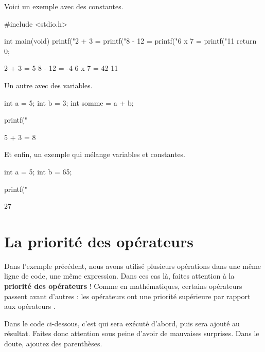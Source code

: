 Voici un exemple avec des constantes.

\begin{C}
#include <stdio.h>

int main(void)
{
    printf("2 + 3 = %
    printf("8 - 12 = %
    printf("6 x 7 = %
    printf("11 %
    return 0;
}
\end{C}

\begin{C}
2 + 3 = 5
8 - 12 = -4
6 x 7 = 42
11 %
\end{C}

Un autre avec des variables.

\begin{C}
int a = 5;
int b = 3;
int somme = a + b;

printf("%
\end{C}

\begin{C}
5 + 3 = 8
\end{C}

Et enfin, un exemple qui mélange variables et constantes.

\begin{C}
int a = 5;
int b = 65;

printf("%
\end{C}

\begin{C}
27
\end{C}

\section{La priorité des opérateurs}
\label{la-priorite-des-operateurs}

Dans l'exemple précédent, nous avons utilisé plusieurs opérations dans
une même ligne de code, une même expression. Dans ces cas là, faites
attention à la \textbf{priorité des opérateurs} ! Comme en
mathématiques, certains opérateurs passent avant d'autres : les
opérateurs \mybox{* \textbackslash \%} ont une priorité supérieure par rapport aux
opérateurs \mybox{+ -}.

Dans le code ci-dessous, c'est  qui sera exécuté
d'abord, puis  sera ajouté au résultat. Faites donc attention
sous peine d'avoir de mauvaises surprises. Dans le doute, ajoutez des
parenthèses.

\begin{C}
c a = b + c * 4;}
\end{C}

